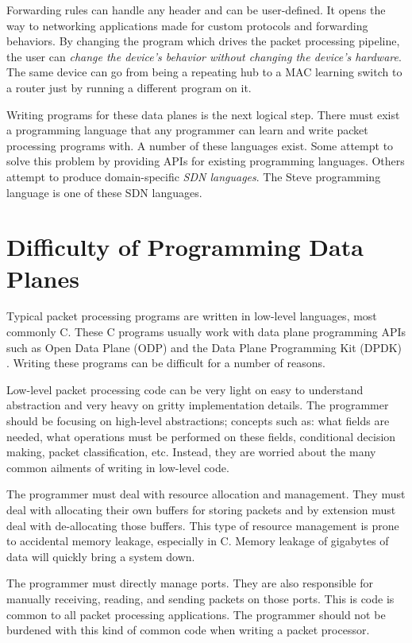Forwarding rules can handle any header and can be user-defined. It opens the way to networking applications made for custom protocols and forwarding behaviors. By changing the program which drives the packet processing pipeline, the user can \textit{change the device's behavior without changing the device's hardware}. The same device can go from being a repeating hub to a MAC learning switch to a router just by running a different program on it.

Writing programs for these data planes is the next logical step. There must exist a programming language that any programmer can learn and write packet processing programs with. A number of these languages exist. Some attempt to solve this problem by providing APIs for existing programming languages. Others attempt to produce domain-specific \textit{SDN languages}. The Steve programming language is one of these SDN languages.

\section{Difficulty of Programming Data Planes}

Typical packet processing programs are written in low-level languages, most commonly C. These C programs usually work with data plane programming APIs such as Open Data Plane (ODP) \cite{odp_webpage} and the Data Plane Programming Kit (DPDK) \cite{dpdk_webpage}. Writing these programs can be difficult for a number of reasons.

Low-level packet processing code can be very light on easy to understand abstraction and very heavy on gritty implementation details. The programmer should be focusing on high-level abstractions; concepts such as: what fields are needed, what operations must be performed on these fields, conditional decision making, packet classification, etc. Instead, they are worried about the many common ailments of writing in low-level code.

The programmer must deal with resource allocation and management. They must deal with allocating their own buffers for storing packets and by extension must deal with de-allocating those buffers. This type of resource management is prone to accidental memory leakage, especially in C. Memory leakage of gigabytes of data will quickly bring a system down.

The programmer must directly manage ports. They are also responsible for manually receiving, reading, and sending packets on those ports. This is code is common to all packet processing applications. The programmer should not be burdened with this kind of common code when writing a packet processor.

